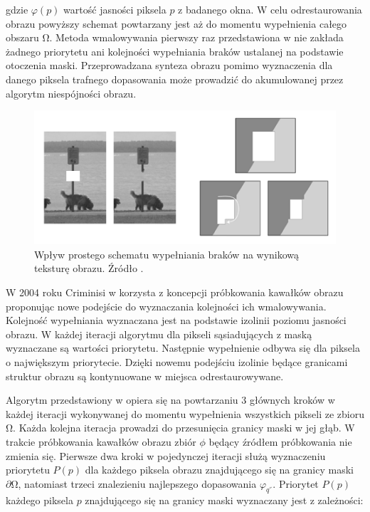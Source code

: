 \documentclass[12pt, twoside, openany]{report}
\theoremstyle{definition}
\begin{document}
gdzie $\varphi \left(p\right)$ wartość jasności piksela $p$ z badanego okna. W celu odrestaurowania obrazu powyższy schemat powtarzany jest aż do momentu wypełnienia całego obszaru $\mathrm{\Omega }$.
Metoda wmalowywania pierwszy raz przedstawiona w  \cite{efros1999texture} nie zakłada żadnego priorytetu ani kolejności wypełniania braków ustalanej na podstawie otoczenia maski. Przeprowadzana synteza obrazu pomimo wyznaczenia dla danego piksela trafnego dopasowania może prowadzić do akumulowanej przez algorytm niespójności obrazu.
\begin{figure}[!h]
	\centering
	\includegraphics[scale=1]{rysunki/4_fig2}
	\caption{Wpływ prostego schematu wypełniania braków na wynikową teksturę obrazu. Źródło \cite{criminisi2004region}.}
	\label{4_fig2} 
\end{figure}
\par
W 2004 roku Criminisi w \cite{criminisi2004region} korzysta z koncepcji próbkowania kawałków obrazu proponując nowe podejście do wyznaczania kolejności ich wmalowywania.  Kolejność wypełniania wyznaczana jest na podstawie izolinii poziomu jasności obrazu. W każdej iteracji algorytmu dla pikseli sąsiadujących z maską wyznaczane są wartości priorytetu. Następnie wypełnienie odbywa się dla piksela o największym priorytecie. Dzięki nowemu podejściu izolinie będące granicami struktur obrazu są kontynuowane w miejsca odrestaurowywane.
\par
Algorytm przedstawiony w \cite{criminisi2004region} opiera się na powtarzaniu 3 głównych kroków w każdej iteracji wykonywanej do momentu wypełnienia wszystkich pikseli ze zbioru $\mathrm{\Omega }$. Każda kolejna iteracja prowadzi do przesunięcia granicy maski w jej głąb. W trakcie próbkowania kawałków obrazu zbiór $\phi $ będący źródłem próbkowania nie zmienia się. Pierwsze dwa kroki w pojedynczej iteracji służą wyznaczeniu priorytetu $P\left(p\right)$ dla każdego piksela obrazu znajdującego się na granicy maski $\partial \mathrm{\Omega }$, natomiast trzeci znalezieniu najlepszego dopasowania ${\varphi }_{q^{''}}$. Priorytet $P\left(p\right)$ każdego piksela $p$ znajdującego się na granicy maski wyznaczany jest z zależności:
\end{document}
